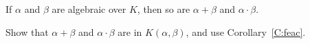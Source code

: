 \documentclass{ximera}
\begin{document}



\begin{corollary}
  If $\alpha$ and $\beta$ are algebraic over $K$, then so are
  $\alpha+\beta$ and $\alpha\cdot \beta$.
  \begin{sketch}
    Show that $\alpha+\beta$ and $\alpha\cdot \beta$ are in
    $K(\alpha,\beta)$, and use Corollary~\ref{C:feac}.
  \end{sketch}
\end{corollary}





    
\end{document}
